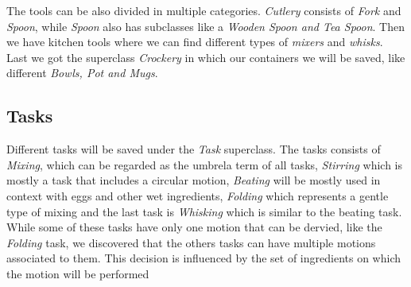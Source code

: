 The tools can be also divided in multiple categories. \textit{Cutlery} consists of \textit{Fork} and \textit{Spoon}, while \textit{Spoon} also has subclasses like a \textit{Wooden Spoon and Tea Spoon}.
Then we have kitchen tools where we can find different types of \textit{mixers} and \textit{whisks}. Last we got the superclass \textit{Crockery} in which our containers we will be saved, like different \textit{Bowls, Pot and Mugs}.

\subsection{Tasks}
Different tasks will be saved under the \textit{Task} superclass. The tasks consists of \textit{Mixing}, which can be regarded as the umbrela term of all tasks, \textit{Stirring} which is mostly a task that includes a circular motion, \textit{Beating} will be mostly used in context with eggs and other wet ingredients, \textit{Folding} which represents a gentle type of mixing and the last task is \textit{Whisking} which is similar to the beating task.
While some of these tasks have only one motion that can be dervied, like the \textit{Folding} task, we discovered that the others tasks can have multiple motions associated to them. This decision is influenced by the set of ingredients on which the motion will be performed

